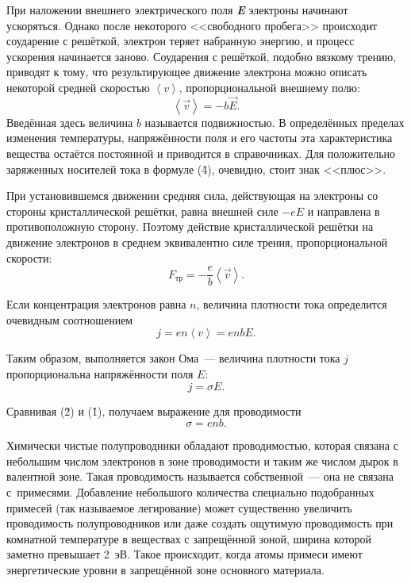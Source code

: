 При наложении внешнего электрического поля {\bf \it E} электроны начинают ускоряться. Однако после некоторого <<свободного пробега>> происходит соударение с решёткой, электрон теряет набранную энергию, и процесс ускорения начинается заново.
Соударения с решёткой, подобно вязкому трению, приводят к тому, что результирующее движение электрона можно описать
некоторой средней скоростью $\left< v \right> $, пропорциональной внешнему полю:
\begin{equation}
\left< \vec{v} \right>=-b\vec{E}.
\end{equation}
Введённая здесь величина $b$ называется \textsf{подвижностью}. В определённых пределах изменения температуры,
напряжённости поля и его частоты эта характеристика вещества остаётся постоянной и приводится в справочниках. Для
положительно заряженных носителей тока в формуле (\r4), очевидно, стоит знак <<плюс>>.

При установившемся движении средняя сила, действующая на электроны со стороны кристаллической решётки, равна внешней силе $-eE$ и направлена в противоположную сторону. Поэтому действие кристаллической решётки на движение электронов в среднем эквивалентно силе трения, пропорциональной скорости:
\begin{equation}
F_{тр}=-\frac{e}{b}\left<\vec{v}\right>.
\end{equation}

Если концентрация электронов равна $n$, величина плотности тока определится очевидным соотношением
\begin{equation}
j=en\left<v\right>=enbE.
\end{equation}

Таким образом, выполняется закон Ома~--- величина плотности тока $j$ пропорциональна напряжённости поля $E$:
\begin{equation}
j=\sigma E.
\end{equation}

Сравнивая (\r{2}) и (\r{1}), получаем выражение для проводимости
\begin{equation}
\sigma=enb.
\end{equation}

Химически чистые полупроводники обладают проводимостью, которая связана с небольшим числом электронов в зоне
проводимости и таким же числом дырок в валентной зоне. Такая проводимость называется {собственной}~--- она не
связана с~примесями. Добавление небольшого количества специально подобранных примесей (так называемое
{легирование}) может существенно увеличить проводимость полупроводников или даже создать ощутимую проводимость при
комнатной температуре в веществах с запрещённой зоной, ширина которой заметно превышает 2~эВ. Такое происходит, когда атомы примеси имеют энергетические уровни в запрещённой зоне основного материала.

